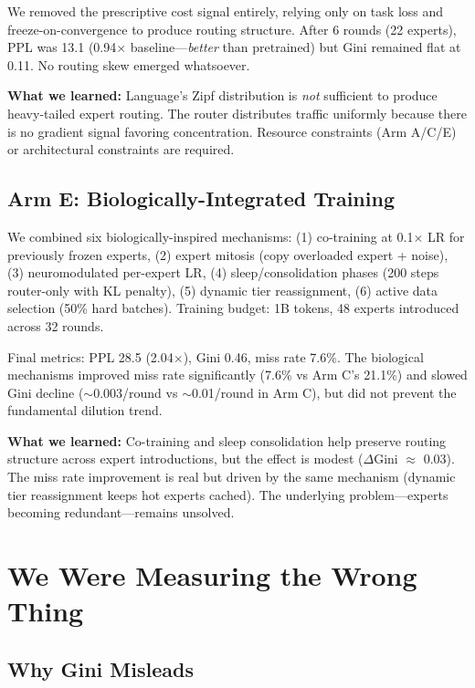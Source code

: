 \documentclass{article}
\begin{document}
We removed the prescriptive cost signal entirely, relying only on task loss and freeze-on-convergence to produce routing structure. After 6 rounds (22 experts), PPL was 13.1 (0.94$\times$ baseline---\emph{better} than pretrained) but Gini remained flat at 0.11. No routing skew emerged whatsoever.

\textbf{What we learned:} Language's Zipf distribution is \emph{not} sufficient to produce heavy-tailed expert routing. The router distributes traffic uniformly because there is no gradient signal favoring concentration. Resource constraints (Arm A/C/E) or architectural constraints are required.

\subsection{Arm E: Biologically-Integrated Training}

We combined six biologically-inspired mechanisms: (1) co-training at 0.1$\times$ LR for previously frozen experts, (2) expert mitosis (copy overloaded expert + noise), (3) neuromodulated per-expert LR, (4) sleep/consolidation phases (200 steps router-only with KL penalty), (5) dynamic tier reassignment, (6) active data selection (50\% hard batches). Training budget: 1B tokens, 48 experts introduced across 32 rounds.

Final metrics: PPL 28.5 (2.04$\times$), Gini 0.46, miss rate 7.6\%. The biological mechanisms improved miss rate significantly (7.6\% vs Arm C's 21.1\%) and slowed Gini decline ($\sim$0.003/round vs $\sim$0.01/round in Arm C), but did not prevent the fundamental dilution trend.

\textbf{What we learned:} Co-training and sleep consolidation help preserve routing structure across expert introductions, but the effect is modest ($\Delta$Gini $\approx$ 0.03). The miss rate improvement is real but driven by the same mechanism (dynamic tier reassignment keeps hot experts cached). The underlying problem---experts becoming redundant---remains unsolved.

\section{We Were Measuring the Wrong Thing}

\subsection{Why Gini Misleads}
\end{document}
